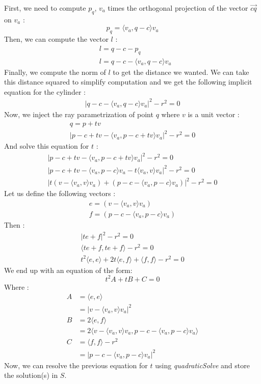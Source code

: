 \documentclass{article}
\begin{document}
First, we need to compute $p_q$, $v_a$ times the orthogonal projection of the vector $\overrightarrow{cq}$ on $v_a$ :
$$p_q = \langle v_a, q-c\rangle  v_a$$
Then, we can compute the vector $l$ :
\begin{align*}
    &l = q-c-p_q \\
    &l = q-c - \langle v_a, q-c\rangle  v_a
\end{align*}
Finally, we compute the norm of $l$ to get the distance we wanted. We can take this distance squared to simplify computation and we get the following implicit equation for the cylinder :
\begin{gather*}
    |q-c-\langle v_a, q-c\rangle  v_a|^2 - r^2 = 0
\end{gather*}
Now, we inject the ray parametrization of point $q$ where $v$ is a unit vector :
\begin{gather*}
    q=p+tv \\
    |p-c+tv-\langle v_a, p-c+tv\rangle v_a|^2-r^2=0
\end{gather*}
And solve this equation for $t$ :
\begin{gather*}
    |p-c+tv-\langle v_a, p-c+tv\rangle v_a|^2-r^2=0\\
    |p-c+tv - \langle v_a, p-c\rangle v_a - t\langle v_a, v\rangle v_a|^2 -r^2=0\\
    |t(v-\langle v_a, v\rangle v_a) + (p-c- \langle v_a, p-c\rangle v_a)|^2 -r^2 = 0
\end{gather*}
Let us define the following vectors :
\begin{gather*}
    e = (v-\langle v_a, v\rangle v_a)\\
    f = (p-c- \langle v_a, p-c\rangle v_a)
\end{gather*}
Then :
\begin{gather*}
    |te + f|^2 -r^2 = 0\\
    \langle te+f, te+f\rangle  -r^2 = 0\\
    t^2  \langle e,e\rangle  + 2t\langle e, f\rangle  + \langle f,f\rangle  -r^2 = 0
\end{gather*}
We end up with an equation of the form:
$$t^2A + tB + C = 0$$
Where :
\begin{align*}
    A &= \langle e,e\rangle  \\
    &= |v-\langle v_a, v\rangle v_a|^2\\
    B &= 2\langle e, f\rangle  \\
    &= 2\langle v-\langle v_a, v\rangle v_a, p-c- \langle v_a, p-c\rangle v_a\rangle \\
    C &= \langle f,f\rangle  -r^2 \\
    &= |p-c- \langle v_a, p-c\rangle v_a|^2
\end{align*}
Now, we can resolve the previous equation for $t$ using \textit{quadraticSolve} and store the solution(s) in $S$.
\end{document}
